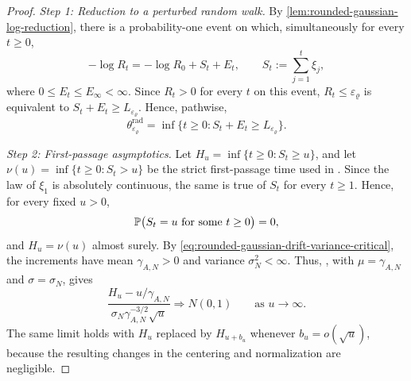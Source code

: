\documentclass[11pt,reqno,a4paper]{article}
\newcommand{\Pp}{\P}
\begin{document}
\begin{proof}
  \emph{Step 1: Reduction to a perturbed random walk.}
  By \cref{lem:rounded-gaussian-log-reduction}, there is a probability-one
  event on which, simultaneously for every $t\geq0$,
  \begin{equation*}
    -\log R_t
    =
    -\log R_0+S_t+E_t,
    \qquad
    S_t:=\sum_{j=1}^t\xi_j,
  \end{equation*}
  where $0\leq E_t\leq E_\infty<\infty$. Since $R_t>0$ for every $t$ on this
  event, $R_t\leq\varepsilon_\varrho$ is equivalent to
  $S_t+E_t\geq L_{\varepsilon_\varrho}$. Hence, pathwise,
  \begin{equation*}
    \theta_{\varepsilon_\varrho}^{\mathrm{rad}}
    =
    \inf\{t\geq0:S_t+E_t\geq L_{\varepsilon_\varrho}\}.
  \end{equation*}

  \emph{Step 2: First-passage asymptotics.}
  Let $H_u=\inf\{t\geq0:S_t\geq u\}$, and let
  $\nu(u)=\inf\{t\geq0:S_t>u\}$ be the strict first-passage time used in
  \cite{gut2009stopped}. Since the law of $\xi_1$ is absolutely continuous,
  the same is true of $S_t$ for every $t\geq1$. Hence, for every fixed $u>0$,
  \begin{equation*}
    \Pp\bigl(S_t=u\text{ for some }t\geq0\bigr)=0,
  \end{equation*}
  and $H_u=\nu(u)$ almost surely. By
  \cref{eq:rounded-gaussian-drift-variance-critical}, the increments have mean
  $\gamma_{A,N}>0$ and variance $\sigma_N^2<\infty$. Thus,
  \cite[Theorem~3.5.1]{gut2009stopped}, with
  $\mu=\gamma_{A,N}$ and $\sigma=\sigma_N$, gives
  \begin{equation*}
    \frac{H_u-u/\gamma_{A,N}}
    {\sigma_N\gamma_{A,N}^{-3/2}\sqrt u}
    \Rightarrow N(0,1)
    \qquad\mbox{as }u\to\infty.
  \end{equation*}
  The same limit holds with $H_u$ replaced by $H_{u+b_u}$ whenever
  $b_u=o(\sqrt u)$, because the resulting changes in the centering and
  normalization are negligible.


\end{proof}
\end{document}
